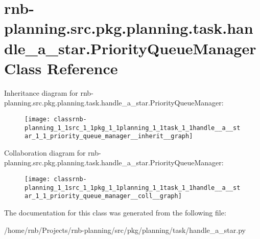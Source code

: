 \hypertarget{classrnb-planning_1_1src_1_1pkg_1_1planning_1_1task_1_1handle__a__star_1_1_priority_queue_manager}{}\section{rnb-\/planning.src.\+pkg.\+planning.\+task.\+handle\+\_\+a\+\_\+star.\+Priority\+Queue\+Manager Class Reference}
\label{classrnb-planning_1_1src_1_1pkg_1_1planning_1_1task_1_1handle__a__star_1_1_priority_queue_manager}


Inheritance diagram for rnb-\/planning.src.\+pkg.\+planning.\+task.\+handle\+\_\+a\+\_\+star.\+Priority\+Queue\+Manager\+:\nopagebreak
\begin{figure}[H]
\begin{center}
\leavevmode
\texttt{[image: classrnb-planning\_1\_1src\_1\_1pkg\_1\_1planning\_1\_1task\_1\_1handle\_\_a\_\_star\_1\_1\_priority\_queue\_manager\_\_inherit\_\_graph]}
\end{center}
\end{figure}


Collaboration diagram for rnb-\/planning.src.\+pkg.\+planning.\+task.\+handle\+\_\+a\+\_\+star.\+Priority\+Queue\+Manager\+:\nopagebreak
\begin{figure}[H]
\begin{center}
\leavevmode
\texttt{[image: classrnb-planning\_1\_1src\_1\_1pkg\_1\_1planning\_1\_1task\_1\_1handle\_\_a\_\_star\_1\_1\_priority\_queue\_manager\_\_coll\_\_graph]}
\end{center}
\end{figure}


The documentation for this class was generated from the following file\+:\begin{DoxyCompactItemize}
\item 
/home/rnb/\+Projects/rnb-\/planning/src/pkg/planning/task/handle\+\_\+a\+\_\+star.\+py\end{DoxyCompactItemize}
